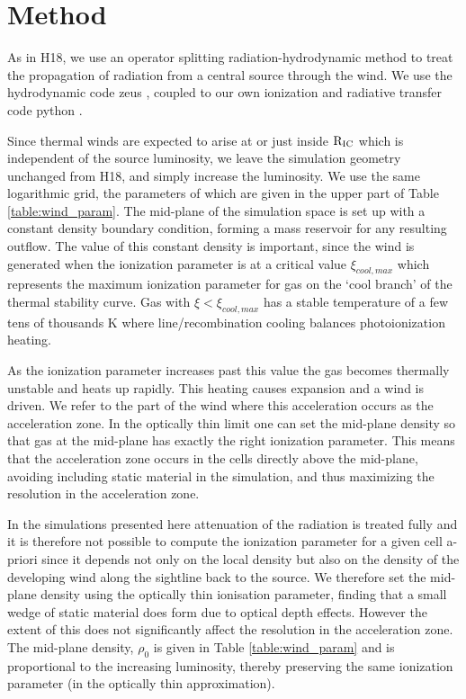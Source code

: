 \documentclass[a4paper,fleqn,usenatbib]{mnras}
\begin{document}
 

\section{Method }
\label{section:method}

As in H18, we use an operator splitting radiation-hydrodynamic method to treat the propagation of radiation
from a central source through the wind. We use the hydrodynamic code {\sc zeus} 
\citep[][extended by \citealt{2000ApJ...543..686P}]{1992ApJS...80..753S}, coupled to our own ionization and
 radiative transfer code {\sc python} \citep[][extended by \citealt{,2013MNRAS.436.1390H} and 
 \citealt{2015MNRAS.450.3331M}]{2002ApJ...579..725L}. 

Since thermal winds are expected to arise at or just inside $\rm{R_{IC}}$ which is independent of the source 
luminosity, we leave the simulation geometry unchanged
from H18, and simply increase the luminosity. We use the same logarithmic grid, the parameters of which are given in the upper
part of Table \ref{table:wind_param}. The mid-plane of the simulation space is set up with a constant 
density boundary condition, forming a mass reservoir for any resulting outflow. The value of this constant density
is important, since the wind is generated when the ionization parameter is at a critical value $\xi_{cool,max}$ which
represents the maximum ionization parameter for gas on the `cool branch' of the thermal stability curve. Gas with
$\xi<\xi_{cool,max}$ has a stable temperature of a few tens of thousands K where line/recombination cooling 
balances photoionization heating. 

As the 
ionization parameter increases past this value the gas becomes thermally unstable and heats up rapidly. 
This heating causes expansion and
a wind is driven. We refer to the part of the wind where this acceleration occurs as the acceleration zone.
In the optically thin limit one can set the mid-plane density so that gas at the mid-plane has
exactly the right ionization parameter. This means that the acceleration zone occurs in the cells directly 
above the mid-plane, avoiding including static material in the simulation, and thus maximizing the resolution in the acceleration zone.

In the simulations presented here attenuation of the radiation is treated fully and it is therefore not possible to 
compute the ionization parameter for a given cell a-priori since it depends not only on the local density  
but also on the density of the developing wind along the 
sightline back to the source. 
We therefore set the mid-plane density using the optically thin ionisation parameter,
finding that a small wedge of static material does form due to optical depth effects. However the extent of this does not significantly
affect the resolution in the acceleration zone. The mid-plane density, $\rho_0$ is given in Table
\ref{table:wind_param} and is proportional to the increasing luminosity, thereby preserving the same
ionization parameter (in the optically thin approximation).
\end{document}
